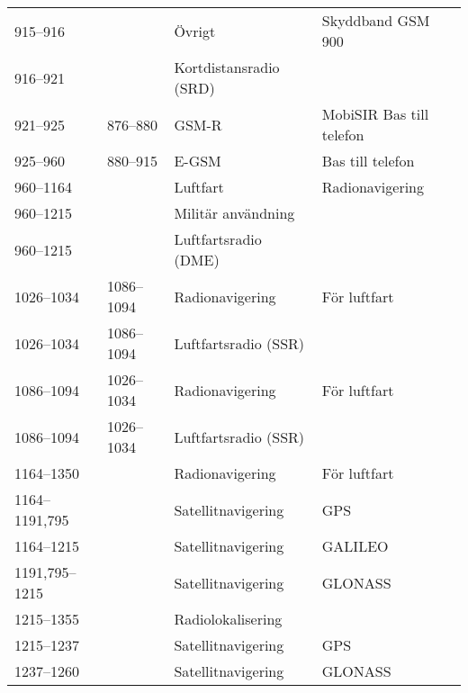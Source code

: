 \begin{landscape}
\begin{longtable}{llll}
	915--916           &                    & Övrigt                  & Skyddband GSM 900                     \\
	916--921           &                    & Kortdistansradio (SRD)  &                                       \\
	921--925           & 876--880           & GSM-R                   & MobiSIR Bas till telefon              \\
	925--960           & 880--915           & E-GSM                   & Bas till telefon                      \\
	960--1164          &                    & Luftfart                & Radionavigering                       \\
	960--1215          &                    & Militär användning      &                                       \\
	960--1215          &                    & Luftfartsradio (DME)    &                                       \\
	1026--1034         & 1086--1094         & Radionavigering         & För luftfart                          \\
	1026--1034         & 1086--1094         & Luftfartsradio (SSR)    &                                       \\
	1086--1094         & 1026--1034         & Radionavigering         & För luftfart                          \\
	1086--1094         & 1026--1034         & Luftfartsradio (SSR)    &                                       \\
	1164--1350         &                    & Radionavigering         & För luftfart                          \\
	1164--1191,795     &                    & Satellitnavigering      & GPS                                   \\
	1164--1215         &                    & Satellitnavigering      & GALILEO                               \\
	1191,795--1215     &                    & Satellitnavigering      & GLONASS                               \\
	1215--1355         &                    & Radiolokalisering       &                                       \\
	1215--1237         &                    & Satellitnavigering      & GPS                                   \\
	1237--1260         &                    & Satellitnavigering      & GLONASS                               \\

\end{longtable}
\end{landscape}
